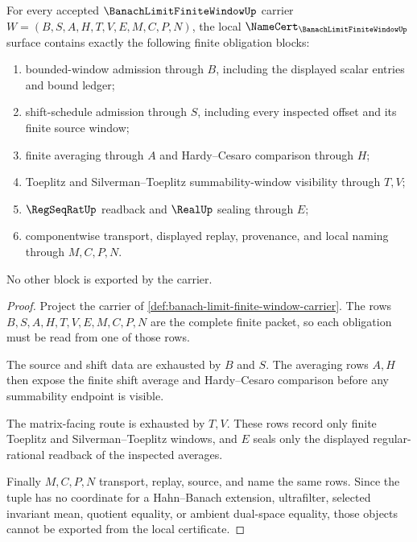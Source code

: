 \begin{theorem}
\label{thm:banach-limit-finite-window-namecert-obligations}
For every accepted $\BanachLimitFiniteWindowUp$ carrier $W=(B,S,A,H,T,V,E,M,C,P,N)$, the local $\NameCert_{\BanachLimitFiniteWindowUp}$ surface contains exactly the following finite obligation blocks:
\begin{enumerate}
\item bounded-window admission through $B$, including the displayed scalar entries and bound ledger;
\item shift-schedule admission through $S$, including every inspected offset and its finite source window;
\item finite averaging through $A$ and Hardy--Cesaro comparison through $H$;
\item Toeplitz and Silverman--Toeplitz summability-window visibility through $T,V$;
\item $\RegSeqRatUp$ readback and $\RealUp$ sealing through $E$;
\item componentwise transport, displayed replay, provenance, and local naming through $M,C,P,N$.
\end{enumerate}
No other block is exported by the carrier.
\end{theorem}
\begin{proof}
Project the carrier of \autoref{def:banach-limit-finite-window-carrier}. The rows $B,S,A,H,T,V,E,M,C,P,N$ are the complete finite packet, so each obligation must be read from one of those rows.

The source and shift data are exhausted by $B$ and $S$. The averaging rows $A,H$ then expose the finite shift average and Hardy--Cesaro comparison before any summability endpoint is visible.

The matrix-facing route is exhausted by $T,V$. These rows record only finite Toeplitz and Silverman--Toeplitz windows, and $E$ seals only the displayed regular-rational readback of the inspected averages.

Finally $M,C,P,N$ transport, replay, source, and name the same rows. Since the tuple has no coordinate for a Hahn--Banach extension, ultrafilter, selected invariant mean, quotient equality, or ambient dual-space equality, those objects cannot be exported from the local certificate.
\end{proof}

